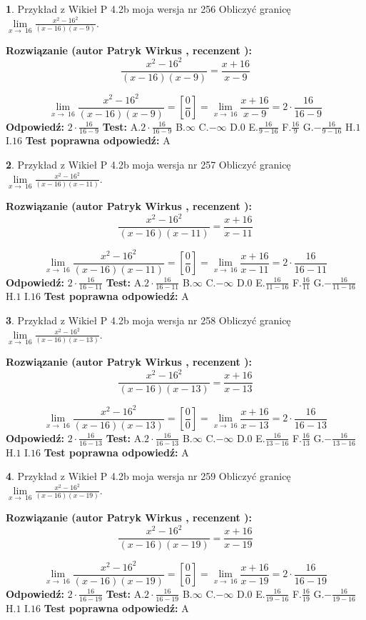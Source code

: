 \documentclass[12pt, a4paper]{article}
\theoremstyle{definition} %
\newtheorem{zad}{}
\newcommand{\zadStart}[1]{\begin{zad}#1\newline}
\newcommand{\zadStop}{\end{zad}}
\newcommand{\rozwStart}[2]{\noindent \textbf{Rozwiązanie (autor #1 , recenzent #2): }\newline}
\newcommand{\rozwStop}{\newline}
\newcommand{\odpStart}{\noindent \textbf{Odpowiedź:}\newline}
\newcommand{\odpStop}{\newline}
\newcommand{\testStart}{\noindent \textbf{Test:}\newline}
\newcommand{\testStop}{\newline}
\newcommand{\kluczStart}{\noindent \textbf{Test poprawna odpowiedź:}\newline}
\newcommand{\kluczStop}{\newline}
\begin{document}
\zadStart{Przykład z Wikieł P 4.2b moja wersja nr 256}
Obliczyć granicę $\lim\limits_{x\to\ 16}\frac{x^{2}-16^{2}}{(x-16)(x-9)}$.
\zadStop
\rozwStart{Patryk Wirkus}{}
$$\frac{x^{2}-16^{2}}{(x-16)(x-9)}=\frac{x+16}{x-9}$$

$$\lim\limits_{x\to\ 16}\frac{x^{2}-16^{2}}{(x-16)(x-9)}=[\frac{0}{0}]=\lim\limits_{x\to\ 16}\frac{x+16}{x-9}=2 \cdot \frac{16}{16-9}$$
\rozwStop
\odpStart
$2 \cdot \frac{16}{16-9}$
\odpStop
\testStart
A.$2 \cdot \frac{16}{16-9}$
B.$\infty$
C.$-\infty$
D.$0$
E.$\frac{16}{9-16}$
F.$\frac{16}{9}$
G.$-\frac{16}{9-16}$
H.$1$
I.$16$
\testStop
\kluczStart
A
\kluczStop



\zadStart{Przykład z Wikieł P 4.2b moja wersja nr 257}
Obliczyć granicę $\lim\limits_{x\to\ 16}\frac{x^{2}-16^{2}}{(x-16)(x-11)}$.
\zadStop
\rozwStart{Patryk Wirkus}{}
$$\frac{x^{2}-16^{2}}{(x-16)(x-11)}=\frac{x+16}{x-11}$$

$$\lim\limits_{x\to\ 16}\frac{x^{2}-16^{2}}{(x-16)(x-11)}=[\frac{0}{0}]=\lim\limits_{x\to\ 16}\frac{x+16}{x-11}=2 \cdot \frac{16}{16-11}$$
\rozwStop
\odpStart
$2 \cdot \frac{16}{16-11}$
\odpStop
\testStart
A.$2 \cdot \frac{16}{16-11}$
B.$\infty$
C.$-\infty$
D.$0$
E.$\frac{16}{11-16}$
F.$\frac{16}{11}$
G.$-\frac{16}{11-16}$
H.$1$
I.$16$
\testStop
\kluczStart
A
\kluczStop



\zadStart{Przykład z Wikieł P 4.2b moja wersja nr 258}
Obliczyć granicę $\lim\limits_{x\to\ 16}\frac{x^{2}-16^{2}}{(x-16)(x-13)}$.
\zadStop
\rozwStart{Patryk Wirkus}{}
$$\frac{x^{2}-16^{2}}{(x-16)(x-13)}=\frac{x+16}{x-13}$$

$$\lim\limits_{x\to\ 16}\frac{x^{2}-16^{2}}{(x-16)(x-13)}=[\frac{0}{0}]=\lim\limits_{x\to\ 16}\frac{x+16}{x-13}=2 \cdot \frac{16}{16-13}$$
\rozwStop
\odpStart
$2 \cdot \frac{16}{16-13}$
\odpStop
\testStart
A.$2 \cdot \frac{16}{16-13}$
B.$\infty$
C.$-\infty$
D.$0$
E.$\frac{16}{13-16}$
F.$\frac{16}{13}$
G.$-\frac{16}{13-16}$
H.$1$
I.$16$
\testStop
\kluczStart
A
\kluczStop



\zadStart{Przykład z Wikieł P 4.2b moja wersja nr 259}
Obliczyć granicę $\lim\limits_{x\to\ 16}\frac{x^{2}-16^{2}}{(x-16)(x-19)}$.
\zadStop
\rozwStart{Patryk Wirkus}{}
$$\frac{x^{2}-16^{2}}{(x-16)(x-19)}=\frac{x+16}{x-19}$$

$$\lim\limits_{x\to\ 16}\frac{x^{2}-16^{2}}{(x-16)(x-19)}=[\frac{0}{0}]=\lim\limits_{x\to\ 16}\frac{x+16}{x-19}=2 \cdot \frac{16}{16-19}$$
\rozwStop
\odpStart
$2 \cdot \frac{16}{16-19}$
\odpStop
\testStart
A.$2 \cdot \frac{16}{16-19}$
B.$\infty$
C.$-\infty$
D.$0$
E.$\frac{16}{19-16}$
F.$\frac{16}{19}$
G.$-\frac{16}{19-16}$
H.$1$
I.$16$
\testStop
\kluczStart
A
\kluczStop
\end{document}
